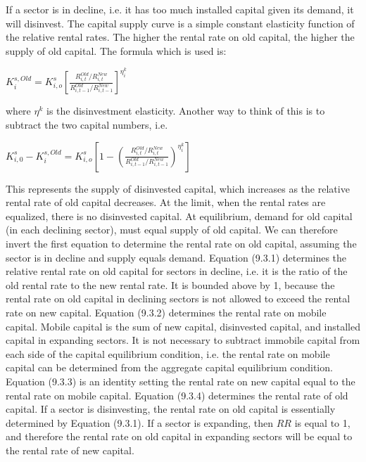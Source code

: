 \documentclass[12pt]{article}
\begin{document}
If a sector is in decline, i.e. it has too much installed capital given its demand, it will disinvest. The capital supply curve is a simple constant elasticity function of the relative rental rates. The higher the rental rate on old capital, the higher the supply of old capital. The formula which is used is:

\begin{center}

$K^{s,Old}_i = K^s_{i, o}\left[\frac{R^{Old}_{i, t}/R^{New}_{i, t}}{R^{Old}_{i, t-1}/R^{New}_{i, t-1}}\right]^{\eta^k_i}$

\end{center}

where $\eta^k$ is the disinvestment elasticity. Another way to think of this is to subtract the two capital numbers, i.e.

\begin{center}

$K^s_{i, 0} - K^{s, Old}_i = K^s_{i, o}\left[1- \left(\frac{R^{Old}_{i, t}/R^{New}_{i, t}}{R^{Old}_{i, t-1}/R^{New}_{i, t-1}}\right)^{\eta^k_i}\right]$

\end{center}

This represents the supply of disinvested capital, which increases as the relative rental rate of old capital decreases. At the limit, when the rental rates are equalized, there is no disinvested capital. At equilibrium, demand for old capital (in each declining sector), must equal supply of old capital. We can therefore invert the first equation to determine the rental rate on old capital, assuming the sector is in decline and supply equals demand. Equation (9.3.1) determines the relative rental rate on old capital for sectors in decline, i.e. it is the ratio of the old rental rate to the new rental rate. It is bounded above by 1, because the rental rate on old capital in declining sectors is not allowed to exceed the rental rate on new capital.
Equation (9.3.2) determines the rental rate on mobile capital. Mobile capital is the sum of new capital, disinvested capital, and installed capital in expanding sectors. It is not necessary to subtract immobile capital from each side of the capital equilibrium condition, i.e. the rental rate on mobile capital can be determined from the aggregate capital equilibrium condition. Equation (9.3.3) is an identity setting the rental rate on new capital equal to the rental rate on mobile capital. Equation (9.3.4) determines the rental rate of old capital. If a sector is disinvesting, the rental rate on old capital is essentially determined by Equation (9.3.1). If a sector is expanding, then $RR$ is equal to 1, and therefore the rental rate on old capital in expanding sectors will be equal to the rental rate of new capital.
\end{document}
